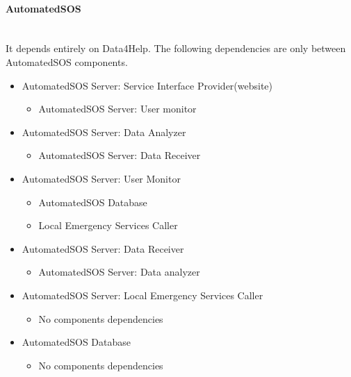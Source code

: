 \documentclass[../DD.tex]{subfiles}
\begin{document}
\paragraph{AutomatedSOS}\mbox{}\\
It depends entirely on Data4Help. The following dependencies are only between AutomatedSOS components.
\begin{itemize}
	\item{AutomatedSOS Server: Service Interface Provider(website)}
	\begin{itemize}\item{AutomatedSOS Server: User monitor}\end{itemize}

	\item{AutomatedSOS Server: Data Analyzer}
	\begin{itemize}\item{AutomatedSOS Server: Data Receiver}\end{itemize}

	\item{AutomatedSOS Server: User Monitor}
	\begin{itemize}\item{AutomatedSOS Database}\item{Local Emergency Services Caller}\end{itemize}

	\item{AutomatedSOS Server: Data Receiver}
	\begin{itemize}\item{AutomatedSOS Server: Data analyzer}\end{itemize}

	\item{AutomatedSOS Server: Local Emergency Services Caller}
	\begin{itemize}\item{No components dependencies}\end{itemize}

	\item{AutomatedSOS Database}
	\begin{itemize}\item{No components dependencies}\end{itemize}
\end{itemize}
\end{document}
